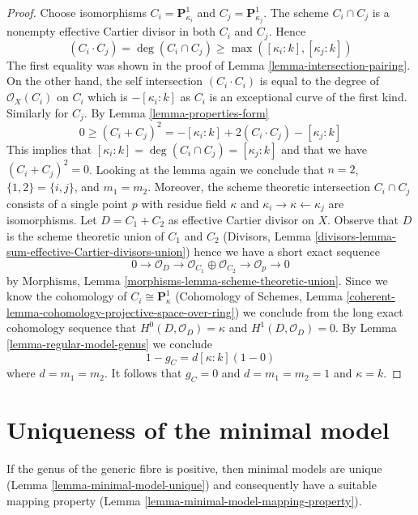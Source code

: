 \documentclass{stacks-project}
\theoremstyle{plain}
\theoremstyle{definition}
\theoremstyle{remark}
\numberwithin{equation}{subsection}
\begin{document}
\begin{proof}
Choose isomorphisms $C_i = \mathbf{P}^1_{\kappa_i}$ and
$C_j = \mathbf{P}^1_{\kappa_j}$. The scheme $C_i \cap C_j$
is a nonempty effective Cartier divisor in both $C_i$ and $C_j$.
Hence
$$
(C_i \cdot C_j) = \deg(C_i \cap C_j) \geq \max([\kappa_i: k], [\kappa_j : k])
$$
The first equality was shown in the proof of
Lemma \ref{lemma-intersection-pairing}.
On the other hand, the self intersection $(C_i \cdot C_i)$ is equal
to the degree of $\mathcal{O}_X(C_i)$ on $C_i$ which is $-[\kappa_i : k]$
as $C_i$ is an exceptional curve of the first kind. Similarly for
$C_j$. By Lemma \ref{lemma-properties-form}
$$
0 \geq (C_i + C_j)^2 = -[\kappa_i : k] + 2(C_i \cdot C_j) - [\kappa_j : k]
$$
This implies that $[\kappa_i : k] = \deg(C_i \cap C_j) = [\kappa_j : k]$
and that we have $(C_i + C_j)^2 = 0$. Looking at the lemma again
we conclude that $n = 2$, $\{1, 2\} = \{i, j\}$, and $m_1 = m_2$.
Moreover, the scheme theoretic intersection $C_i \cap C_j$ consists of
a single point $p$ with residue field $\kappa$ and
$\kappa_i \to \kappa \leftarrow \kappa_j$ are isomorphisms.
Let $D = C_1 + C_2$ as effective Cartier divisor on $X$.
Observe that $D$ is the scheme theoretic union of $C_1$ and $C_2$
(Divisors, Lemma \ref{divisors-lemma-sum-effective-Cartier-divisors-union})
hence we have a short exact sequence
$$
0 \to \mathcal{O}_D \to \mathcal{O}_{C_1} \oplus \mathcal{O}_{C_2} \to
\mathcal{O}_p \to 0
$$
by Morphisms, Lemma \ref{morphisms-lemma-scheme-theoretic-union}.
Since we know the cohomology of $C_i \cong \mathbf{P}^1_\kappa$
(Cohomology of Schemes, Lemma
\ref{coherent-lemma-cohomology-projective-space-over-ring})
we conclude from the long exact cohomology sequence that
$H^0(D, \mathcal{O}_D) = \kappa$ and
$H^1(D, \mathcal{O}_D) = 0$. By Lemma \ref{lemma-regular-model-genus}
we conclude
$$
1 - g_C = d[\kappa : k](1 - 0)
$$
where $d = m_1 = m_2$. It follows that $g_C = 0$ and $d = m_1 = m_2 = 1$
and $\kappa = k$.
\end{proof}





\section{Uniqueness of the minimal model}
\label{section-uniqueness}

\noindent
If the genus of the generic fibre is positive, then minimal models are unique
(Lemma \ref{lemma-minimal-model-unique}) and consequently have a suitable
mapping property (Lemma \ref{lemma-minimal-model-mapping-property}).
\end{document}
